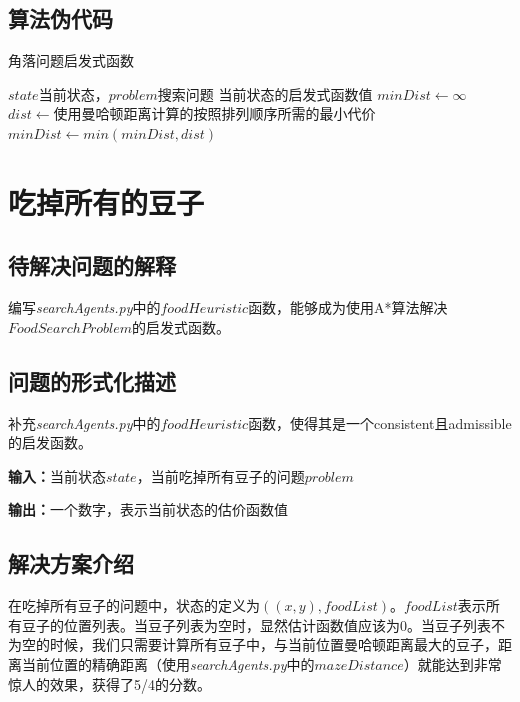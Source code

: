 \documentclass[forprint]{WHUBachelor}
\begin{document}
\subsection{算法伪代码}

\begin{algorithm}[H]
  \caption{角落问题启发式函数}
  \begin{algorithmic}[1] %
    \Require $state$当前状态，$problem$搜索问题
    \Ensure 当前状态的启发式函数值
    \State $minDist \gets \infty$
    \State $dist \gets $使用曼哈顿距离计算的按照排列顺序所需的最小代价
    \State $minDist \gets min(minDist, dist)$
    \EndFor
    \State {}
  \end{algorithmic}
\end{algorithm}

\section{吃掉所有的豆子}

\subsection{待解决问题的解释}

编写\emph{searchAgents.py}中的$foodHeuristic$函数，能够成为使用A*算法解决$FoodSearchProblem$的启发式函数。

\subsection{问题的形式化描述}

补充\emph{searchAgents.py}中的$foodHeuristic$函数，使得其是一个consistent且admissible的启发函数。

\textbf{输入：}当前状态$state$，当前吃掉所有豆子的问题$problem$

\textbf{输出：}一个数字，表示当前状态的估价函数值

\subsection{解决方案介绍}

在吃掉所有豆子的问题中，状态的定义为$((x,y), foodList)$。$foodList$表示所有豆子的位置列表。当豆子列表为空时，显然估计函数值应该为0。当豆子列表不为空的时候，我们只需要计算所有豆子中，与当前位置曼哈顿距离最大的豆子，距离当前位置的精确距离（使用\emph{searchAgents.py}中的$mazeDistance$）就能达到非常惊人的效果，获得了5/4的分数。
\end{document}
